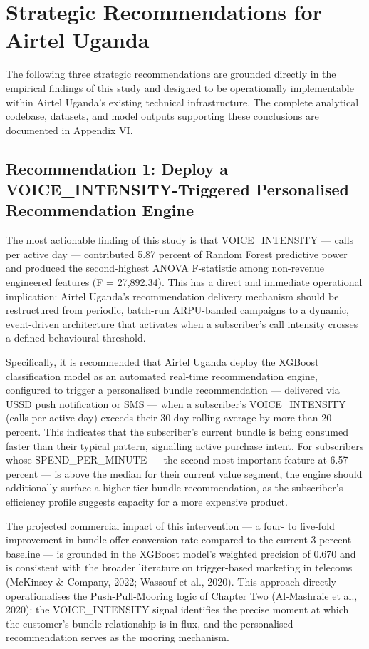 \section{Strategic Recommendations for Airtel Uganda}

The following three strategic recommendations are grounded directly in the empirical findings of this study and designed to be operationally implementable within Airtel Uganda's existing technical infrastructure. The complete analytical codebase, datasets, and model outputs supporting these conclusions are documented in Appendix VI.


\subsection{Recommendation 1: Deploy a VOICE\_INTENSITY-Triggered Personalised Recommendation Engine}

The most actionable finding of this study is that VOICE\_INTENSITY --- calls per active day --- contributed 5.87 percent of Random Forest predictive power and produced the second-highest ANOVA F-statistic among non-revenue engineered features (F = 27,892.34). This has a direct and immediate operational implication: Airtel Uganda's recommendation delivery mechanism should be restructured from periodic, batch-run ARPU-banded campaigns to a dynamic, event-driven architecture that activates when a subscriber's call intensity crosses a defined behavioural threshold.

Specifically, it is recommended that Airtel Uganda deploy the XGBoost classification model as an automated real-time recommendation engine, configured to trigger a personalised bundle recommendation --- delivered via USSD push notification or SMS --- when a subscriber's VOICE\_INTENSITY (calls per active day) exceeds their 30-day rolling average by more than 20 percent. This indicates that the subscriber's current bundle is being consumed faster than their typical pattern, signalling active purchase intent. For subscribers whose SPEND\_PER\_MINUTE --- the second most important feature at 6.57 percent --- is above the median for their current value segment, the engine should additionally surface a higher-tier bundle recommendation, as the subscriber's efficiency profile suggests capacity for a more expensive product.

The projected commercial impact of this intervention --- a four- to five-fold improvement in bundle offer conversion rate compared to the current 3 percent baseline --- is grounded in the XGBoost model's weighted precision of 0.670 and is consistent with the broader literature on trigger-based marketing in telecoms (McKinsey \& Company, 2022; Wassouf et al., 2020). This approach directly operationalises the Push-Pull-Mooring logic of Chapter Two (Al-Mashraie et al., 2020): the VOICE\_INTENSITY signal identifies the precise moment at which the customer's bundle relationship is in flux, and the personalised recommendation serves as the mooring mechanism.



